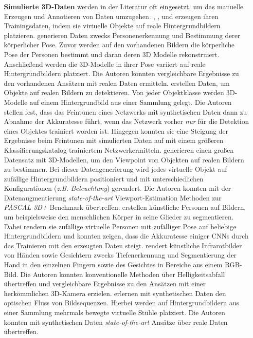 \textbf{Simulierte 3D-Daten} werden in der Literatur oft eingesetzt, um das manuelle Erzeugen und Annotieren von Daten umzugehen. \citet{pishchulinArticulatedPeopleDetection2012a}, \citet{pengLearningDeepObject2014}, \citet{suRenderCNNViewpoint2015} und \citet{varolLearningSyntheticHumans2017} erzeugen ihren Trainingsdaten, indem sie virtuelle Objekte auf reale Hintergrundbildern platzieren. \citet{pishchulinArticulatedPeopleDetection2012a} generieren Daten zwecks Personenerkennung und Bestimmung derer körperlicher Pose. Zuvor werden auf den vorhandenen Bildern die körperliche Pose der Personen bestimmt und daran deren 3D Modelle rekonstruiert. Anschließend werden die 3D-Modelle in ihrer Pose variiert auf reale Hintergrundbildern platziert. Die Autoren konnten vergleichbare Ergebnisse zu den vorhandenen Ansätzen mit realen Daten ermitteln. \citet{pengLearningDeepObject2014} erstellen Daten, um Objekte auf realen Bildern zu detektieren. Von jeder Objektklasse werden 3D-Modelle auf einem Hintergrundbild aus einer Sammlung gelegt. Die Autoren stellen fest, dass das Feintunen eines Netzwerks mit synthetischen Daten dann zu Abnahme der Akkuratesse führt, wenn das Netzwerk vorher \textit{nur} für die Detektion eines Objektes trainiert worden ist. Hingegen konnten sie eine Steigung der Ergebnisse beim Feintunen mit simulierten Daten auf mit einem größeren Klassifierungskatalog trainiertem Netzwerkermitteln. \citet{suRenderCNNViewpoint2015} generieren einen großen Datensatz mit 3D-Modellen, um den Viewpoint von Objekten auf realen Bildern zu bestimmen. Bei dieser Datengenerierung wird jedes virtuelle Objekt auf zufällige Hintergrundbildern positioniert und mit unterschiedlichen Konfigurationen (\textit{z.B. Beleuchtung}) gerendert. Die Autoren konnten mit der Datenaugmentierung \textit{state-of-the-art} Viewport-Estimation Methoden zur \textit{PASCAL 3D+}\cite{xiangPASCALBenchmark3D2014} Benchmark übertreffen. \citet{varolLearningSyntheticHumans2017} erstellen künstliche Personen auf Bildern, um beispielsweise den menschlichen Körper in seine Glieder zu segmentieren. Dabei rendern sie zufällige virtuelle Personen mit zufälliger Pose auf beliebige Hintergrundbildern und konnten zeigen, dass die Akkuratesse einiger CNNs durch das Trainieren mit den erzeugten Daten steigt. \citet{fanelloLearningBeDepth2014} rendert künstliche Infrarotbilder von Händen sowie Gesichtern zwecks Tiefenerkennung und Segmentierung der Hand in den einzelnen Fingern sowie des Gesichtes in Bereiche aus einem RGB-Bild. Die Autoren konnten konventionelle Methoden über  Helligkeitsabfall übertreffen und vergleichbare Ergebnisse zu den Ansätzen mit einer herkömmlichen 3D-Kamera erzielen. \citet{dosovitskiyFlowNetLearningOptical2015} erlernen mit synthetischen Daten den optischen Fluss von Bildsequenzen.  Hierbei werden auf Hintergrundbildern aus einer Sammlung mehrmals bewegte virtuelle Stühle platziert. Die Autoren konnten mit synthetischen Daten \textit{state-of-the-art} Ansätze über reale Daten übertreffen.

